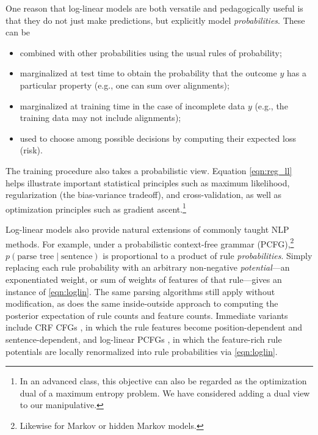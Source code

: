 \documentclass[11pt,letterpaper]{article}
\begin{document}
One reason that log-linear models are both versatile and pedagogically
useful is that they do not just make predictions, but explicitly 
model {\em probabilities}.  These can be 
\begin{itemize}
\item combined with other probabilities using the usual rules of probability;
\item marginalized at test time to obtain the probability that the outcome 
  $y$ has a particular property (e.g., one can sum over alignments);
\item marginalized at training time in the case of incomplete data $y$
  (e.g., the training data may not include alignments);
\item used to choose among possible decisions by computing their 
  expected loss (risk).
\end{itemize}
The training procedure also takes a probabilistic view.  Equation
\eqref{eqn:reg_ll} helps illustrate important statistical principles such as maximum
likelihood, regularization (the bias-variance tradeoff), and cross-validation, as well as
optimization principles such as gradient ascent.\footnote{In an
  advanced class, this objective can also be regarded as the
  optimization dual of a maximum entropy problem.  We have considered
  adding a dual view to our manipulative.\label{fn:dual}}

Log-linear models also provide natural extensions of commonly taught
NLP methods.  For example, under a probabilistic context-free
grammar (PCFG),\footnote{Likewise for Markov or hidden Markov models.}  $p(\text{parse tree}\mid\text{sentence})$ is proportional to
a product of rule {\em probabilities}.  Simply replacing each rule
probability with an arbitrary non-negative {\em potential}---an
exponentiated weight, or sum of weights of features of that
rule---gives an instance of \eqref{eqn:loglin}.  The same parsing
algorithms still apply without modification, as does the same
inside-outside approach to computing the posterior expectation of rule counts and 
feature counts.  Immediate variants include CRF CFGs
\cite{finkel2008efficient}, in which the rule features become
position-dependent and sentence-dependent, and log-linear PCFGs
\cite{bergkirkpatrick-et-al-2010}, in which the feature-rich rule
potentials are locally renormalized into rule probabilities via
\eqref{eqn:loglin}.
\end{document}
